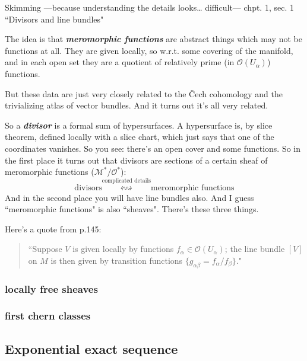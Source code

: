 Skimming ---because understanding the details looks… difficult--- \cite{gri} chpt. 1, sec. 1 ``Divisors and line bundles"

\begin{thing7}{The idea}\leavevmode
is that \textit{\textbf{meromorphic functions}} are abstract things which may not be functions at all. They are given locally, so w.r.t. some covering of the manifold, and in each open set they are a quotient of relatively prime (in \(\mathcal{O}(U_\alpha)\)) functions.

But these data are just very closely related to the Čech cohomology and the trivializing atlas of vector bundles. And it turns out it's all very related.

So a \textit{\textbf{divisor}} is a formal sum of hypersurfaces. A hypersurface is, by \cite{les} slice theorem, defined locally with a slice chart, which just says that one of the coordinates vanishes. So you see: there's an open cover and some functions. So in the first place it turns out that divisors are sections of a certain sheaf of meromorphic functions (\(\mathcal{M}^*/\mathcal{O}^*\)):
\[ \text{divisors} \overset{\text{complicated details} }{\leftrightsquigarrow}\text{meromorphic functions} \]
And in the second place you will have line bundles also. And I guess ``meromorphic functions" is also ``sheaves". There's these three things.

Here's a quote from \cite{gri} p.145:
\begin{quotation}
	``Suppose \(V\) is given locally by functions \(f_\alpha \in \mathcal{O}(U_\alpha)\); the line bundle \([V]\) on \(M\) is then given by transition functions \(\{g_{\alpha \beta}=f_\alpha/f_\beta\}\)."
\end{quotation}

\end{thing7}


\subsubsection{locally free sheaves}

\subsubsection{first chern classes}


\subsection{Exponential exact sequence}

